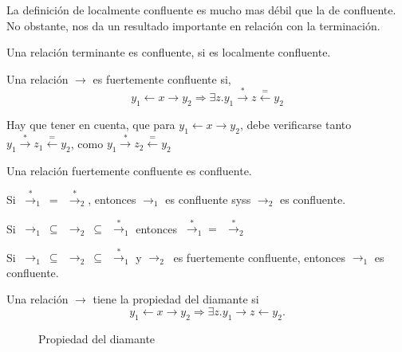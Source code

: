 La definición de localmente confluente es mucho mas débil que la de
confluente. No obstante, nos da un resultado importante en relación con la
terminación.

\begin{lema} 
  Una relación terminante es confluente, si es localmente confluente.
\end{lema}

\begin{defi}
  Una relación $\rightarrow$ es fuertemente confluente si,
  \[
    y_1 \leftarrow x \rightarrow y_2 \Rightarrow 
    \exists z.  y_1 \xrightarrow{*} z \xleftarrow{=} y_2
  \] 
\end{defi}

Hay que tener en cuenta, que para $y_1 \leftarrow x \rightarrow y_2$, debe
verificarse tanto $y_1 \xrightarrow{*} z_1 \xleftarrow{=} y_2$, como
$y_1 \xrightarrow{*} z_2 \xleftarrow{=} y_2$

\begin{lema} 
  Una relación fuertemente confluente es confluente.
\end{lema}

\begin{lema} 
  Si $ \ \xrightarrow{*}_1 \ = \ \ \xrightarrow{*}_2$, entonces $\rightarrow_1$
  es confluente syss $\rightarrow_2$ es confluente.
\end{lema}

\begin{lema}
  Si
  $ \ \rightarrow_1 \ \subseteq \ \ \rightarrow_2 \ \subseteq \ \
  \xrightarrow{*}_1 $ entonces $ \ \xrightarrow{*}_1 = \ \ \xrightarrow{*}_2$
\end{lema}

\begin{coro}
  Si
  $ \ \rightarrow_1 \ \subseteq \ \ \rightarrow_2 \ \subseteq \ \
  \xrightarrow{*}_1 $ y $\rightarrow_2 \ $ es fuertemente confluente, entonces
  $\rightarrow_1$ es confluente.
\end{coro}


\begin{defi}
  Una relación $\rightarrow$ tiene la propiedad del diamante si
  \[
    y_1 \leftarrow x \rightarrow y_2 \Rightarrow \exists z. y_1 \rightarrow z \leftarrow y_2. 
  \]
\end{defi} 

\begin{figure}[h]
  \centering
        
\caption{Propiedad del diamante}
\end{figure}    


